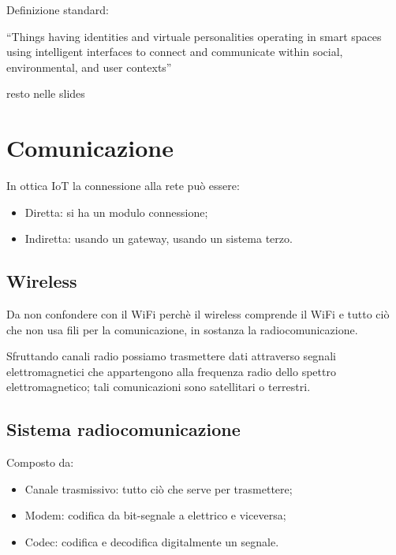 \documentclass[
]{article}
\providecommand{\tightlist}{%
  \setlength{\itemsep}{0pt}\setlength{\parskip}{0pt}}
\begin{document}
{}

{Definizione standard:}

{``Things having identities and virtuale personalities operating in
smart spaces using intelligent interfaces to connect and communicate
within social, }{environmental}{, and user contexts''}

{}

{resto nelle slides}

{}

{}

\section{\texorpdfstring{{Comunicazione}}{Comunicazione}}\label{h.f0q9ldwnyrlb}

{In ottica IoT la connessione alla rete può essere:}

\begin{itemize}
\tightlist
\item
  {Diretta: si ha un modulo connessione;}
\item
  {Indiretta: usando un gateway, usando un sistema terzo.}
\end{itemize}

{}

\subsection{\texorpdfstring{{Wireless}}{Wireless}}\label{h.8t2yaufy3cbt}

{Da non confondere con il WiFi perchè il wireless comprende il WiFi e
tutto ciò che non usa fili per la comunicazione, in sostanza la
radiocomunicazione.}

{Sfruttando canali radio possiamo trasmettere dati attraverso segnali
elettromagnetici che appartengono alla frequenza radio dello spettro
elettromagnetico; }{tali comunicazioni sono satellitari o terrestri.}

{}

\subsection{\texorpdfstring{{Sistema
radiocomunicazione}}{Sistema radiocomunicazione}}\label{h.rbznmriabvm7}

{Composto da:}

\begin{itemize}
\tightlist
\item
  {Canale trasmissivo: tutto ciò che serve per trasmettere;}
\item
  {Modem: codifica da bit-segnale a elettrico e viceversa;}
\item
  {Codec: codifica e decodifica digitalmente un segnale.}
\end{itemize}
\end{document}
